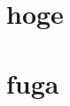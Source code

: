 \documentclass{jbook}
\begin{document}
\setcounter{chapter}{-1}
\chapter{hoge}
\chapter{fuga}
\end{document}
